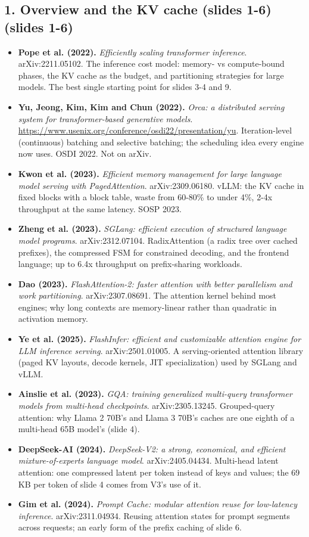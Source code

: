 \documentclass[11pt,letterpaper]{article}
\begin{document}
\subsection*{1. Overview and the KV cache (slides 1-6) (slides 1-6)}
\begin{itemize}[leftmargin=1.2em,itemsep=3pt]\sloppy
\item \textbf{Pope et al. (2022).} \textit{Efficiently scaling transformer inference}. arXiv:2211.05102. The inference cost model: memory- vs compute-bound phases, the KV cache as the budget, and partitioning strategies for large models. The best single starting point for slides 3-4 and 9.
\item \textbf{Yu, Jeong, Kim, Kim and Chun (2022).} \textit{Orca: a distributed serving system for transformer-based generative models}. \url{https://www.usenix.org/conference/osdi22/presentation/yu}. Iteration-level (continuous) batching and selective batching; the scheduling idea every engine now uses. OSDI 2022. Not on arXiv.
\item \textbf{Kwon et al. (2023).} \textit{Efficient memory management for large language model serving with PagedAttention}. arXiv:2309.06180. vLLM: the KV cache in fixed blocks with a block table, waste from 60-80\% to under 4\%, 2-4x throughput at the same latency. SOSP 2023.
\item \textbf{Zheng et al. (2023).} \textit{SGLang: efficient execution of structured language model programs}. arXiv:2312.07104. RadixAttention (a radix tree over cached prefixes), the compressed FSM for constrained decoding, and the frontend language; up to 6.4x throughput on prefix-sharing workloads.
\item \textbf{Dao (2023).} \textit{FlashAttention-2: faster attention with better parallelism and work partitioning}. arXiv:2307.08691. The attention kernel behind most engines; why long contexts are memory-linear rather than quadratic in activation memory.
\item \textbf{Ye et al. (2025).} \textit{FlashInfer: efficient and customizable attention engine for LLM inference serving}. arXiv:2501.01005. A serving-oriented attention library (paged KV layouts, decode kernels, JIT specialization) used by SGLang and vLLM.
\item \textbf{Ainslie et al. (2023).} \textit{GQA: training generalized multi-query transformer models from multi-head checkpoints}. arXiv:2305.13245. Grouped-query attention: why Llama 2 70B's and Llama 3 70B's caches are one eighth of a multi-head 65B model's (slide 4).
\item \textbf{DeepSeek-AI (2024).} \textit{DeepSeek-V2: a strong, economical, and efficient mixture-of-experts language model}. arXiv:2405.04434. Multi-head latent attention: one compressed latent per token instead of keys and values; the 69 KB per token of slide 4 comes from V3's use of it.
\item \textbf{Gim et al. (2024).} \textit{Prompt Cache: modular attention reuse for low-latency inference}. arXiv:2311.04934. Reusing attention states for prompt segments across requests; an early form of the prefix caching of slide 6.
\end{itemize}
\end{document}
